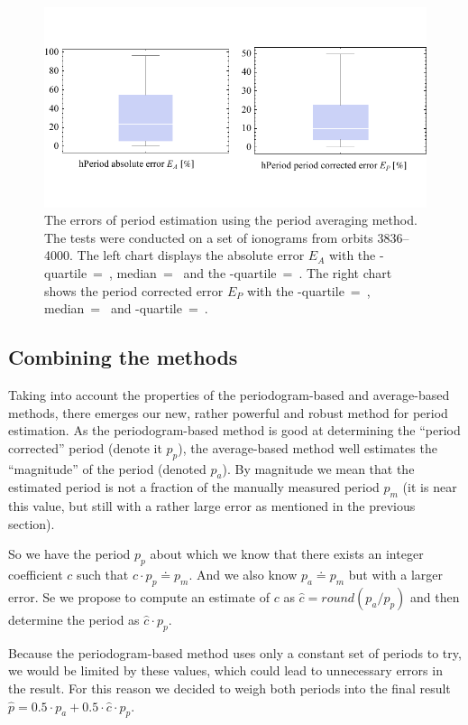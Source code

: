 \begin{figure}
	\centering
	\includegraphics[width=140mm]{images/quantile_errors.pdf}
	\caption{The errors of period estimation using the period averaging method. The tests were conducted on a set of ionograms from orbits 3836--4000. The left chart displays the absolute error $E_A$ with the \mbox{-quartile}~=~, median~=~ and the \mbox{-quartile}~=~. The right chart shows the period corrected error $E_P$ with the \mbox{-quartile}~=~, median~=~ and \mbox{-quartile}~=~.}
	\label{fig:quantile_errors}
\end{figure}

\subsection{Combining the methods}
Taking into account the properties of the periodogram-based and average-based methods, there emerges our new, rather powerful and robust method for period estimation. As the periodogram-based method is good at determining the ``period corrected'' period (denote it $p_p$), the average-based method well estimates the ``magnitude'' of the period (denoted $p_a$). By magnitude we mean that the estimated period is not a fraction of the manually measured period $p_m$ (it is near this value, but still with a rather large error as mentioned in the previous section).

So we have the period $p_p$ about which we know that there exists an integer coefficient $c$ such that $c \cdot p_p \doteq p_m$. And we also know $p_a \doteq p_m$ but with a larger error. Se we propose to compute an estimate of $c$ as $\hat{c} = round(p_a/p_p)$ and then determine the period as $\hat{c} \cdot p_p$.

Because the periodogram-based method uses only a constant set of periods to try, we would be limited by these values, which could lead to unnecessary errors in the result. For this reason we decided to weigh both periods into the final result $\hat{p} = 0.5\cdot p_a + 0.5\cdot \hat{c}\cdot p_p$.  

